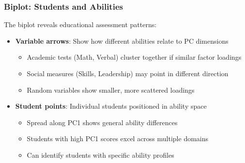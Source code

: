 \documentclass[aspectratio=169]{beamer}
\begin{document}
\begin{frame}
    \frametitle{Biplot: Students and Abilities}
    The biplot reveals educational assessment patterns:
    \begin{itemize}
        \item \textbf{Variable arrows}: Show how different abilities relate to PC dimensions \pause
              \begin{itemize}
                  \item Academic tests (Math, Verbal) cluster together if similar factor loadings \pause
                  \item Social measures (Skills, Leadership) may point in different direction \pause
                  \item Random variables show smaller, more scattered loadings \pause
              \end{itemize}
        \item \textbf{Student points}: Individual students positioned in ability space \pause
              \begin{itemize}
                  \item Spread along PC1 shows general ability differences \pause
                  \item Students with high PC1 scores excel across multiple domains \pause
                  \item Can identify students with specific ability profiles \pause
              \end{itemize}
    \end{itemize}
\end{frame}
\end{document}
